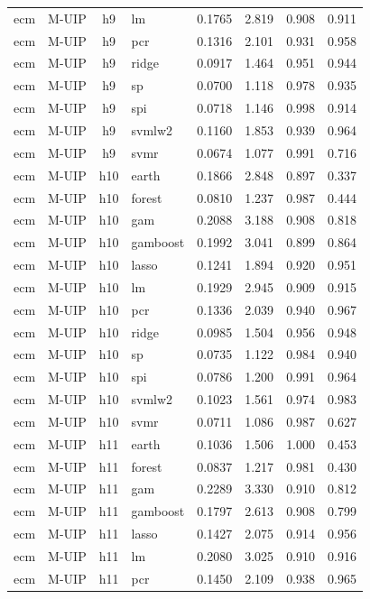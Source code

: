\begin{ThreePartTable}
\begin{longtable}[t]{llclcccc}
ecm & M-UIP & h9 & lm & 0.1765 & 2.819 & 0.908 & 0.911\\
ecm & M-UIP & h9 & pcr & 0.1316 & 2.101 & 0.931 & 0.958\\
ecm & M-UIP & h9 & ridge & 0.0917 & 1.464 & 0.951 & 0.944\\
ecm & M-UIP & h9 & sp & 0.0700 & 1.118 & 0.978 & 0.935\\
ecm & M-UIP & h9 & spi & 0.0718 & 1.146 & 0.998 & 0.914\\
ecm & M-UIP & h9 & svmlw2 & 0.1160 & 1.853 & 0.939 & 0.964\\
ecm & M-UIP & h9 & svmr & 0.0674 & 1.077 & 0.991 & 0.716\\
\addlinespace
ecm & M-UIP & h10 & earth & 0.1866 & 2.848 & 0.897 & 0.337\\
ecm & M-UIP & h10 & forest & 0.0810 & 1.237 & 0.987 & 0.444\\
ecm & M-UIP & h10 & gam & 0.2088 & 3.188 & 0.908 & 0.818\\
ecm & M-UIP & h10 & gamboost & 0.1992 & 3.041 & 0.899 & 0.864\\
ecm & M-UIP & h10 & lasso & 0.1241 & 1.894 & 0.920 & 0.951\\
ecm & M-UIP & h10 & lm & 0.1929 & 2.945 & 0.909 & 0.915\\
ecm & M-UIP & h10 & pcr & 0.1336 & 2.039 & 0.940 & 0.967\\
ecm & M-UIP & h10 & ridge & 0.0985 & 1.504 & 0.956 & 0.948\\
ecm & M-UIP & h10 & sp & 0.0735 & 1.122 & 0.984 & 0.940\\
ecm & M-UIP & h10 & spi & 0.0786 & 1.200 & 0.991 & 0.964\\
ecm & M-UIP & h10 & svmlw2 & 0.1023 & 1.561 & 0.974 & 0.983\\
ecm & M-UIP & h10 & svmr & 0.0711 & 1.086 & 0.987 & 0.627\\
\addlinespace
ecm & M-UIP & h11 & earth & 0.1036 & 1.506 & 1.000 & 0.453\\
ecm & M-UIP & h11 & forest & 0.0837 & 1.217 & 0.981 & 0.430\\
ecm & M-UIP & h11 & gam & 0.2289 & 3.330 & 0.910 & 0.812\\
ecm & M-UIP & h11 & gamboost & 0.1797 & 2.613 & 0.908 & 0.799\\
ecm & M-UIP & h11 & lasso & 0.1427 & 2.075 & 0.914 & 0.956\\
ecm & M-UIP & h11 & lm & 0.2080 & 3.025 & 0.910 & 0.916\\
ecm & M-UIP & h11 & pcr & 0.1450 & 2.109 & 0.938 & 0.965\\

\end{longtable}
\end{ThreePartTable}
